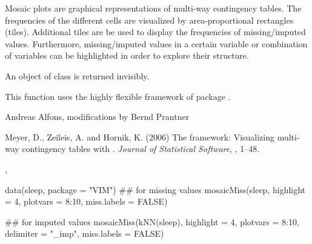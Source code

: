 %
\begin{Details}\relax
Mosaic plots are graphical representations of multi-way contingency tables.  
The frequencies of the different cells are visualized by area-proportional 
rectangles (tiles).  Additional tiles are be used to display the frequencies 
of missing/imputed values.  Furthermore, missing/imputed values in a certain variable or
combination of variables can be highlighted in order to explore their 
structure.
\end{Details}
%
\begin{Value}
An object of class  is returned invisibly.
\end{Value}
%
\begin{Note}\relax
This function uses the highly flexible  framework of package 
.
\end{Note}
%
\begin{Author}\relax
Andreas Alfons, modifications by Bernd Prantner
\end{Author}
%
\begin{References}\relax
Meyer, D., Zeileis, A. and Hornik, K. (2006) The  framework: 
Visualizing multi-way contingency tables with . \emph{Journal of 
Statistical Software}, , 1--48.
\end{References}
%
\begin{SeeAlso}\relax
{}, 
\end{SeeAlso}
%
\begin{Examples}
\begin{ExampleCode}
data(sleep, package = "VIM")
## for missing values
mosaicMiss(sleep, highlight = 4, 
    plotvars = 8:10, miss.labels = FALSE)

## for imputed values
mosaicMiss(kNN(sleep), highlight = 4, 
    plotvars = 8:10, delimiter = "_imp", miss.labels = FALSE)
\end{ExampleCode}
\end{Examples}
